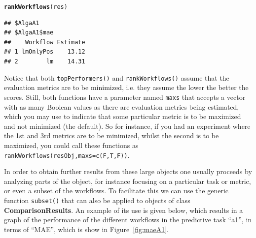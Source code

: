 \documentclass[10pt,a4paper]{article}\usepackage[]{graphicx}\usepackage[]{color}
\makeatletter
\newcommand{\hlstd}[1]{\textcolor[rgb]{0.345,0.345,0.345}{#1}}%
\newcommand{\hlkwd}[1]{\textcolor[rgb]{0.737,0.353,0.396}{\textbf{#1}}}%
\newenvironment{kframe}{%
 \def\at@end@of@kframe{}%
 \ifinner\ifhmode%
  \def\at@end@of@kframe{\end{minipage}}%
  \begin{minipage}{\columnwidth}%
 \fi\fi%
 \def\FrameCommand##1{\hskip\@totalleftmargin \hskip-\fboxsep
 \colorbox{shadecolor}{##1}\hskip-\fboxsep
     \hskip-\linewidth \hskip-\@totalleftmargin \hskip\columnwidth}%
 \MakeFramed {\advance\hsize-\width
   \@totalleftmargin\z@ \linewidth\hsize
   \@setminipage}}%
 {\par\unskip\endMakeFramed%
 \at@end@of@kframe}
\newenvironment{knitrout}{}{} %
\makeatother
\begin{document}
\begin{knitrout}\scriptsize
{}\color{fgcolor}\begin{kframe}
\begin{alltt}
\hlkwd{rankWorkflows}\hlstd{(res)}
\end{alltt}
\begin{verbatim}
## $AlgaA1
## $AlgaA1$mae
##    Workflow Estimate
## 1 lmOnlyPos    13.12
## 2        lm    14.31
\end{verbatim}
\end{kframe}
\end{knitrout}

Notice that both \texttt{topPerformers()} and \texttt{rankWorkflows()}
assume that the evaluation metrics are to be minimized, i.e. they
assume the lower the better the scores. Still, both functions have a
parameter named \texttt{maxs} that accepts a vector with as many
Boolean values as there are evaluation metrics being estimated, which
you may use to indicate that some particular metric is to be maximized
and not minimized (the default). So for instance, if you had an
experiment where the 1st and 3rd metrics are to be minimized, whilst
the second is to be maximized, you could call these functions as
\texttt{rankWorkflows(resObj,maxs=c(F,T,F))}.

In order to obtain further results from these large objects one
usually proceeds by analyzing parts of the object, for instance
focusing on a particular task or metric, or even a subset of the
workflows. To facilitate this we can use the generic function
\texttt{subset()} that can also be applied to objects of class
\textbf{ComparisonResults}. An example of its use is given below, which results
in a graph of the performance of the different workflows in the
predictive task ``a1'', in terms of ``MAE'', which is show in
Figure~\ref{fig:maeA1}.
\end{document}
